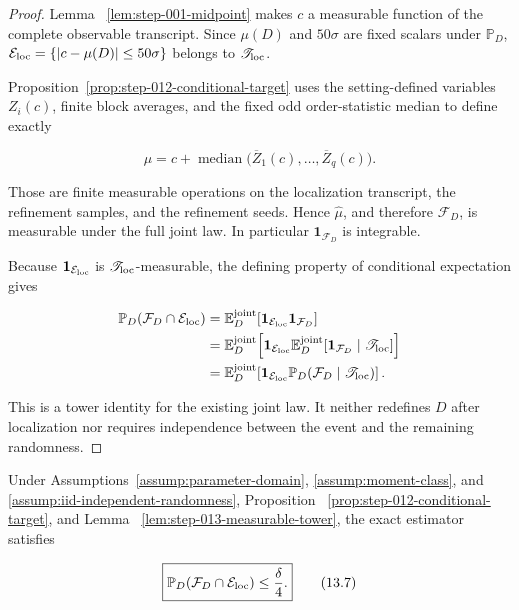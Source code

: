 \begin{proof}
Lemma~
\ref{lem:step-001-midpoint} makes \(c\) a measurable function of the
complete observable transcript. Since \(\mu(D)\) and \(50\sigma\) are
fixed scalars under \(\mathbb P_D\),
\(\mathcal E_{\rm loc}=\{|c-\mu(D)|\leq50\sigma\}\) belongs to
\(\mathscr T_{\rm loc}\).

Proposition~\ref{prop:step-012-conditional-target} uses the
setting-defined variables \(Z_i(c)\), finite block averages, and the fixed
odd order-statistic median to define exactly

\[
\widehat\mu
=c+\operatorname{median}\bigl(\overline Z_1(c),\ldots,
\overline Z_q(c)\bigr).
\]

Those are finite measurable operations on the localization transcript, the
refinement samples, and the refinement seeds. Hence \(\widehat\mu\), and
therefore \(\mathcal F_D\), is measurable under the full joint law. In
particular \(\mathbf1_{\mathcal F_D}\) is integrable.

Because \(\mathbf1_{\mathcal E_{\rm loc}}\) is
\(\mathscr T_{\rm loc}\)-measurable, the defining property of conditional
expectation gives

\[
\begin{aligned}
\mathbb P_D(\mathcal F_D\cap\mathcal E_{\rm loc})
&=\mathbb E_D^{\rm joint}
  [\mathbf1_{\mathcal E_{\rm loc}}\mathbf1_{\mathcal F_D}]\\
&=\mathbb E_D^{\rm joint}\!\left[
  \mathbf1_{\mathcal E_{\rm loc}}
  \mathbb E_D^{\rm joint}
  [\mathbf1_{\mathcal F_D}\mid\mathscr T_{\rm loc}]
  \right]\\
&=\mathbb E_D^{\rm joint}\!\left[
  \mathbf1_{\mathcal E_{\rm loc}}
  \mathbb P_D(\mathcal F_D\mid\mathscr T_{\rm loc})
  \right].
\end{aligned}
\]

This is a tower identity for the existing joint law. It neither redefines
\(D\) after localization nor requires independence between the event and the
remaining randomness.
\end{proof}

\begin{proposition}\label{prop:step-013-localized-failure}
Under Assumptions~\ref{assump:parameter-domain},
\ref{assump:moment-class}, and
\ref{assump:iid-independent-randomness}, Proposition~
\ref{prop:step-012-conditional-target}, and Lemma~
\ref{lem:step-013-measurable-tower}, the exact estimator satisfies

\[
\boxed{
\mathbb P_D(\mathcal F_D\cap\mathcal E_{\rm loc})
\leq\frac\delta4.
}
\tag{13.7}
\]
\end{proposition}

